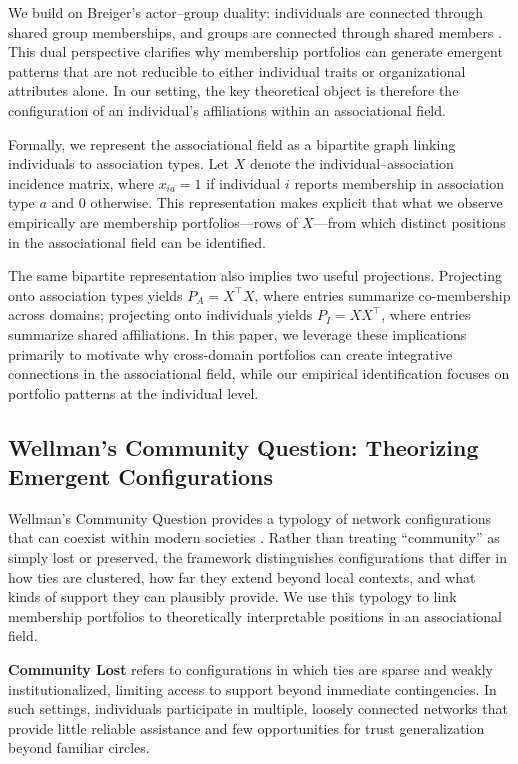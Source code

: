 We build on Breiger's actor--group duality: individuals are connected through shared group memberships, and groups are connected through shared members \parencite{breiger_duality_1974}. This dual perspective clarifies why membership portfolios can generate emergent patterns that are not reducible to either individual traits or organizational attributes alone. In our setting, the key theoretical object is therefore the configuration of an individual's affiliations within an associational field.

Formally, we represent the associational field as a bipartite graph linking individuals to association types. Let $X$ denote the individual--association incidence matrix, where $x_{ia}=1$ if individual $i$ reports membership in association type $a$ and $0$ otherwise. This representation makes explicit that what we observe empirically are membership portfolios---rows of $X$---from which distinct positions in the associational field can be identified.

The same bipartite representation also implies two useful projections. Projecting onto association types yields $P_A = X^\top X$, where entries summarize co-membership across domains; projecting onto individuals yields $P_I = XX^\top$, where entries summarize shared affiliations. In this paper, we leverage these implications primarily to motivate why cross-domain portfolios can create integrative connections in the associational field, while our empirical identification focuses on portfolio patterns at the individual level.


\subsection{Wellman's Community Question: Theorizing Emergent Configurations}

Wellman's Community Question provides a typology of network configurations that can coexist within modern societies \parencite{wellman_community_1979}. Rather than treating ``community'' as simply lost or preserved, the framework distinguishes configurations that differ in how ties are clustered, how far they extend beyond local contexts, and what kinds of support they can plausibly provide. We use this typology to link membership portfolios to theoretically interpretable positions in an associational field.

\textbf{Community Lost} refers to configurations in which ties are sparse and weakly institutionalized, limiting access to support beyond immediate contingencies. In such settings, individuals participate in multiple, loosely connected networks that provide little reliable assistance and few opportunities for trust generalization beyond familiar circles.

